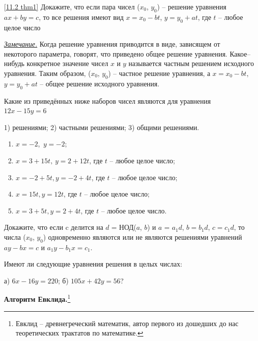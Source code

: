 \begin{thm} \ref{11.2 thm1}
    Докажите, что если пара чисел ($x_0$, $y_0$) -- решение уравнения $ax + by = c$, то все решения имеют вид $x = x_0 - bt$, $y = y_0 + at$, где $t$ -- любое целое число
\end{thm}

\textit{\underline{Замечание.}} Когда решение уравнения приводится в виде, зависящем от некоторого параметра, говорят, что приведено общее решение уравнения. Какое--нибудь конкретное значение чисел $x$ и $y$ называется частным решением исходного уравнения. Таким образом, ($x_0$, $y_0$) -- частное решение уравнения, а $x = x_0 - bt$, $y = y_0 + at$ -- общее решение исходного уравнения.

\begin{ex}
    Какие из приведённых ниже наборов чисел являются для уравнения $12x - 15y = 6$
    \par 
    1) решениями; 2) частными решениями; 3) общими решениями.
    \begin{enumerate}[noitemsep, label=\asbuk*), ref=\asbuk*]
        \item $x = -2$,~$y = -2$; 
        \item $x = 3 + 15t,~y = 2 + 12t$, где $t$ -- любое целое число;
        \item $x = -2 + 5t, y = -2 + 4t$, где $t$ -- любое
        целое число;
        \item $x = 15t, y = 12t$, где $t$ -- любое целое число; 
        \item $x = 3 + 5t, y = 2 + 4t$, где $t$ -- любое целое число.
    \end{enumerate}
\end{ex}

\begin{thm}
    Докажите, что если c делится на $d$ = НОД($a$, $b$) и $a$ = $a_1d$, $b = b_1d$, $c = c_1d$, то числа ($x_0$, $y_0$) одновременно являются или не являются решениями уравнений $ay - bx = c$ и $a_1y - b_1x = c_1$.
\end{thm}

\begin{thm}
    Имеют ли следующие уравнения решения в целых числах: 
    \par а) $6x - 16y = 220$; б) $105x + 42y = 56$?
\end{thm}

\begin{center}
    \textbf{Алгоритм Евклида.}\footnote{Евклид -- древнегреческий математик, автор первого из дошедших до нас теоретических трактатов по математике.}
\end{center}

